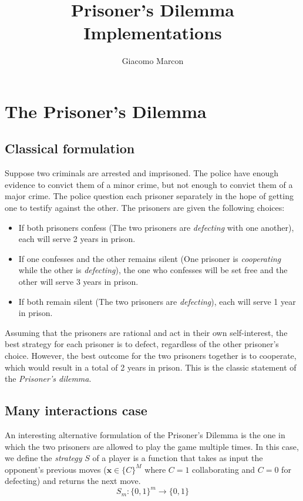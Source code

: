 \documentclass{article}
\title{Prisoner's Dilemma Implementations}
\author{Giacomo Marcon}
\begin{document}
\maketitle
\tableofcontents

\section{The Prisoner's Dilemma}

\subsection{Classical formulation}
Suppose two criminals are arrested and imprisoned. The police have enough evidence to convict them of a minor crime, but not enough to convict them of a major crime. The police question each prisoner separately in the hope of getting one to testify against the other. The prisoners are given the following choices:
\begin{itemize}
    \item If both prisoners confess (The two prisoners are \textit{defecting} with one another), each will serve 2 years in prison.
    \item If one confesses and the other remains silent (One prisoner is \textit{cooperating} while the other is \textit{defecting}), the one who confesses will be set free and the other will serve 3 years in prison.
    \item If both remain silent (The two prisoners are \textit{defecting}), each will serve 1 year in prison.
\end{itemize}
Assuming that the prisoners are rational and act in their own self-interest, the best strategy for each prisoner is to defect, regardless of the other prisoner's choice. However, the best outcome for the two prisoners together is to cooperate, which would result in a total of 2 years in prison. This is the classic statement of the \textit{Prisoner's dilemma}.

\subsection{Many interactions case}
An interesting alternative formulation of the Prisoner's Dilemma is the one in which the two prisoners are allowed to play the game multiple times. In this case, we define the \textit{strategy} $S$ of a player is a function that takes as input the opponent's previous moves ($\mathbf{x} \in \{C\}^M$ where $C=1$ collaborating and $C=0$ for defecting) and returns the next move.
\begin{equation}
    S_m: \{0,1\}^m \rightarrow \{0,1\}
\end{equation}
\end{document}

